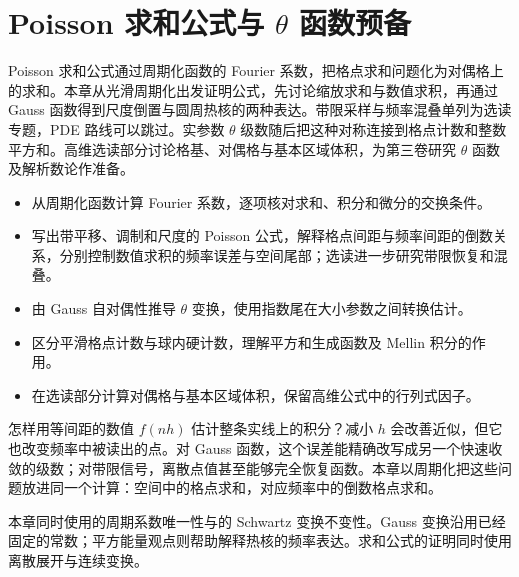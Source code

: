 \chapter{Poisson 求和公式与 \texorpdfstring{\(\theta\)}{\AnalysisPdfTheta} 函数预备}
\label{b2:ch:06}
\begin{chapterabstract}
Poisson 求和公式通过周期化函数的 Fourier 系数，把格点求和问题化为对偶格上的求和。本章从光滑周期化出发证明公式，先讨论缩放求和与数值求积，再通过 Gauss 函数得到尺度倒置与圆周热核的两种表达。带限采样与频率混叠单列为选读专题，PDE 路线可以跳过。实参数 \(\theta\) 级数随后把这种对称连接到格点计数和整数平方和。高维选读部分讨论格基、对偶格与基本区域体积，为第三卷研究 \(\theta\) 函数及解析数论作准备。
\end{chapterabstract}
\begin{learninggoals}
\begin{itemize}
\item\label{b2:item:06-goal-periodic}从周期化函数计算 Fourier 系数，逐项核对求和、积分和微分的交换条件。
\item\label{b2:item:06-goal-scale}写出带平移、调制和尺度的 Poisson 公式，解释格点间距与频率间距的倒数关系，分别控制数值求积的频率误差与空间尾部；选读进一步研究带限恢复和混叠。
\item\label{b2:item:06-goal-theta}由 Gauss 自对偶性推导 \(\theta\) 变换，使用指数尾在大小参数之间转换估计。
\item\label{b2:item:06-goal-count}区分平滑格点计数与球内硬计数，理解平方和生成函数及 Mellin 积分的作用。
\item\label{b2:item:06-goal-lattice}在选读部分计算对偶格与基本区域体积，保留高维公式中的行列式因子。
\end{itemize}
\end{learninggoals}

怎样用等间距的数值 \(f(nh)\) 估计整条实线上的积分？减小 \(h\) 会改善近似，但它也改变频率中被读出的点。对 Gauss 函数，这个误差能精确改写成另一个快速收敛的级数；对带限信号，离散点值甚至能够完全恢复函数。本章以周期化把这些问题放进同一个计算：空间中的格点求和，对应频率中的倒数格点求和。

\ProseParagraphBreak

本章同时使用的周期系数唯一性与的 Schwartz 变换不变性。Gauss 变换沿用已经固定的常数；平方能量观点则帮助解释热核的频率表达。求和公式的证明同时使用离散展开与连续变换。

